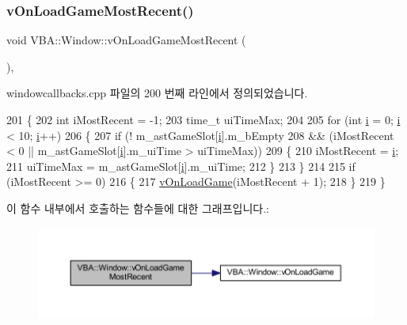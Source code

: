\subsubsection{\texorpdfstring{v\+On\+Load\+Game\+Most\+Recent()}{vOnLoadGameMostRecent()}}
{\footnotesize\ttfamily void V\+B\+A\+::\+Window\+::v\+On\+Load\+Game\+Most\+Recent (\begin{DoxyParamCaption}{ }\end{DoxyParamCaption})\hspace{0.3cm}{\ttfamily [protected]}, {\ttfamily [virtual]}}



windowcallbacks.\+cpp 파일의 200 번째 라인에서 정의되었습니다.


\begin{DoxyCode}
201 \{
202   \textcolor{keywordtype}{int}    iMostRecent = -1;
203   time\_t uiTimeMax;
204 
205   \textcolor{keywordflow}{for} (\textcolor{keywordtype}{int} \mbox{\hyperlink{expr-lex_8cpp_acb559820d9ca11295b4500f179ef6392}{i}} = 0; \mbox{\hyperlink{expr-lex_8cpp_acb559820d9ca11295b4500f179ef6392}{i}} < 10; \mbox{\hyperlink{expr-lex_8cpp_acb559820d9ca11295b4500f179ef6392}{i}}++)
206   \{
207     \textcolor{keywordflow}{if} (! m\_astGameSlot[\mbox{\hyperlink{expr-lex_8cpp_acb559820d9ca11295b4500f179ef6392}{i}}].m\_bEmpty
208         && (iMostRecent < 0 || m\_astGameSlot[\mbox{\hyperlink{expr-lex_8cpp_acb559820d9ca11295b4500f179ef6392}{i}}].m\_uiTime > uiTimeMax))
209     \{
210       iMostRecent = \mbox{\hyperlink{expr-lex_8cpp_acb559820d9ca11295b4500f179ef6392}{i}};
211       uiTimeMax = m\_astGameSlot[\mbox{\hyperlink{expr-lex_8cpp_acb559820d9ca11295b4500f179ef6392}{i}}].m\_uiTime;
212     \}
213   \}
214 
215   \textcolor{keywordflow}{if} (iMostRecent >= 0)
216   \{
217     \mbox{\hyperlink{class_v_b_a_1_1_window_a18461a94955930d3e10fdb093322d7a9}{vOnLoadGame}}(iMostRecent + 1);
218   \}
219 \}
\end{DoxyCode}
이 함수 내부에서 호출하는 함수들에 대한 그래프입니다.\+:
\nopagebreak
\begin{figure}[H]
\begin{center}
\leavevmode
\includegraphics[width=350pt]{class_v_b_a_1_1_window_ac73a836767434700186832ae1ea49cc5_cgraph}
\end{center}
\end{figure}
